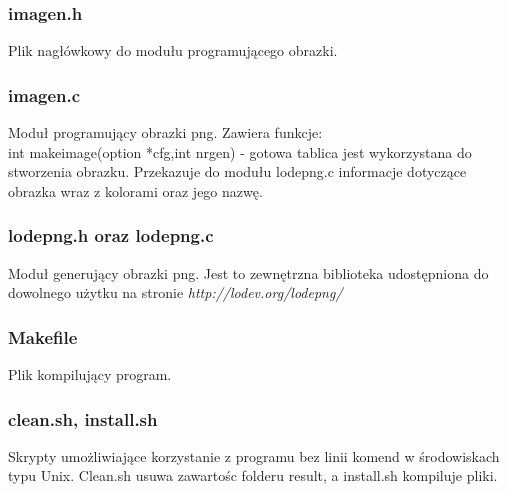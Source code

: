 \documentclass{article}
\begin{document}
\subsubsection*{imagen.h}
Plik nagłówkowy do modułu programującego obrazki.
\subsubsection*{imagen.c}
Moduł programujący obrazki png. Zawiera funkcje:\\
int makeimage(option *cfg,int nrgen) - gotowa tablica jest wykorzystana do stworzenia obrazku. Przekazuje do modułu lodepng.c informacje dotyczące obrazka wraz z kolorami oraz jego nazwę.
\subsubsection*{lodepng.h oraz lodepng.c}
Moduł generujący obrazki png. Jest to zewnętrzna biblioteka udostępniona do dowolnego użytku na stronie\emph{ http://lodev.org/lodepng/}
\subsubsection*{Makefile}
Plik kompilujący program.
\subsubsection*{clean.sh, install.sh}
Skrypty umożliwiające korzystanie z programu bez linii komend w środowiskach typu Unix. Clean.sh usuwa zawartośc folderu result, a install.sh kompiluje pliki.


  
\end{document}
